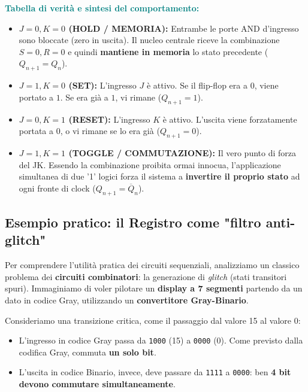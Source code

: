 \documentclass[11pt,a4paper]{report}
\begin{document}
\medskip
\noindent\textcolor{teal}{\textbf{Tabella di verità e sintesi del comportamento:}}
\begin{itemize}[leftmargin=1.5em,itemsep=4pt]
  \item \textbf{$J = 0, K = 0$ (HOLD / MEMORIA):} Entrambe le porte AND d'ingresso sono bloccate (zero in uscita). Il nucleo centrale riceve la combinazione $S=0, R=0$ e quindi \textbf{mantiene in memoria} lo stato precedente ($Q_{n+1}=Q_n$).
  \item \textbf{$J = 1, K = 0$ (SET):} L'ingresso $J$ è attivo. Se il flip-flop era a $0$, viene portato a $1$. Se era già a $1$, vi rimane ($Q_{n+1}=1$).
  \item \textbf{$J = 0, K = 1$ (RESET):} L'ingresso $K$ è attivo. L'uscita viene forzatamente portata a $0$, o vi rimane se lo era già ($Q_{n+1}=0$).
  \item \textbf{$J = 1, K = 1$ (TOGGLE / COMMUTAZIONE):} Il vero punto di forza del JK. Essendo la combinazione proibita ormai innocua, l'applicazione simultanea di due '1' logici forza il sistema a \textbf{invertire il proprio stato} ad ogni fronte di clock ($Q_{n+1}=\overline{Q}_n$).
\end{itemize}
\newpage
\subsection{Esempio pratico: il Registro come "filtro anti-glitch"}

Per comprendere l'utilità pratica dei circuiti sequenziali, analizziamo un classico problema dei \textbf{circuiti combinatori}: la generazione di \emph{glitch} (stati transitori spuri). Immaginiamo di voler pilotare un \textbf{display a 7 segmenti} partendo da un dato in codice Gray, utilizzando un \textbf{convertitore Gray-Binario}.

Consideriamo una transizione critica, come il passaggio dal valore 15 al valore 0:
\begin{itemize}[leftmargin=1.5em,itemsep=2pt]
    \item L'ingresso in codice Gray passa da \texttt{1000} (15) a \texttt{0000} (0). Come previsto dalla codifica Gray, commuta \textbf{un solo bit}.
    \item L'uscita in codice Binario, invece, deve passare da \texttt{1111} a \texttt{0000}: ben \textbf{4 bit devono commutare simultaneamente}.
\end{itemize}
\end{document}
